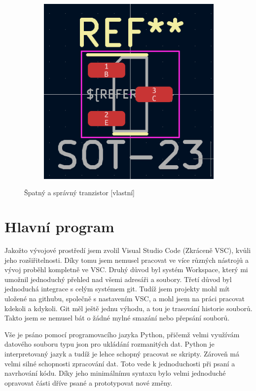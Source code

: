 \documentclass[12pt,a4paper]{article}
\begin{document}
\begin{figure}[H]
\begin{subfigure}[b]{0.49\textwidth}
	  \includegraphics[width=\textwidth]{pictures/right_npn.png}
	\end{subfigure}
	\caption{Špatný a správný tranzistor [vlastní]}
\end{figure}

\section{Hlavní program}
Jakožto vývojové prostředí jsem zvolil Visual Studio Code (Zkráceně VSC), kvůli jeho rozšiřitelnosti. Díky tomu jsem nemusel pracovat ve více různých nástrojů a vývoj proběhl kompletně ve VSC. Druhý důvod byl systém Workspace, který mi umožnil jednoduchý přehled nad všemi adresáři a soubory. Třetí důvod byl jednoduchá integrace s celým systémem git. Tudíž jsem projekty mohl mít uložené na githubu, společně s nastavením VSC, a mohl jsem na práci pracovat kdekoli a kdykoli. Git měl ještě jednu výhodu, a tou je trasování historie souborů. Takto jsem se nemusel bát o žádné mylné smazání nebo přepsání souborů.

Vše je psáno pomocí programovacího jazyka Python, přičemž velmi využívám datového souboru typu json pro ukládání rozmanitých dat. Python je interpretovaný jazyk a tudíž je lehce schopný pracovat se skripty. Zároveň má velmi silné schopnosti zpracování dat. Toto vede k jednoduchosti při psaní a navrhování kódu. Díky jeho minimálnímu syntaxu bylo velmi jednoduché opravovat části dříve psané a prototypovat nové změny. 
\end{document}
